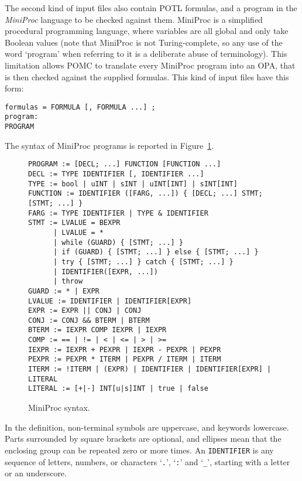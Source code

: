\documentclass[9pt,a4paper]{article}
\begin{document}
The second kind of input files also contain POTL formulas,
and a program in the \emph{MiniProc} language to be checked against them.
MiniProc is a simplified procedural programming language, where variables are all global
and only take Boolean values (note that MiniProc is not Turing-complete,
so any use of the word `program' when referring to it is a deliberate abuse of terminology).
This limitation allows POMC to translate every MiniProc program into an OPA,
that is then checked against the supplied formulas.
This kind of input files have this form:
\begin{verbatim}
formulas = FORMULA [, FORMULA ...] ;
program:
PROGRAM
\end{verbatim}
The syntax of MiniProc programs is reported in Figure~\ref{fig:miniproc-syntax}.
\begin{figure}
\begin{verbatim}
PROGRAM := [DECL; ...] FUNCTION [FUNCTION ...]
DECL := TYPE IDENTIFIER [, IDENTIFIER ...]
TYPE := bool | uINT | sINT | uINT[INT] | sINT[INT]
FUNCTION := IDENTIFIER ([FARG, ...]) { [DECL; ...] STMT; [STMT; ...] }
FARG := TYPE IDENTIFIER | TYPE & IDENTIFIER
STMT := LVALUE = BEXPR
      | LVALUE = *
      | while (GUARD) { [STMT; ...] }
      | if (GUARD) { [STMT; ...] } else { [STMT; ...] }
      | try { [STMT; ...] } catch { [STMT; ...] }
      | IDENTIFIER([EXPR, ...])
      | throw
GUARD := * | EXPR
LVALUE := IDENTIFIER | IDENTIFIER[EXPR]
EXPR := EXPR || CONJ | CONJ
CONJ := CONJ && BTERM | BTERM
BTERM := IEXPR COMP IEXPR | IEXPR
COMP := == | != | < | <= | > | >=
IEXPR := IEXPR + PEXPR | IEXPR - PEXPR | PEXPR
PEXPR := PEXPR * ITERM | PEXPR / ITERM | ITERM
ITERM := !ITERM | (EXPR) | IDENTIFIER | IDENTIFIER[EXPR] | LITERAL
LITERAL := [+|-] INT[u|s]INT | true | false
\end{verbatim}
\caption{MiniProc syntax.}
\label{fig:miniproc-syntax}
\end{figure}
In the definition, non-terminal symbols are uppercase, and keywords lowercase.
Parts surrounded by square brackets are optional, and ellipses mean that the enclosing
group can be repeated zero or more times.
An \texttt{IDENTIFIER} is any sequence of letters, numbers, or characters `\texttt{.}',
`\texttt{:}' and `\texttt{\_}', starting with a letter or an underscore.
\end{document}
